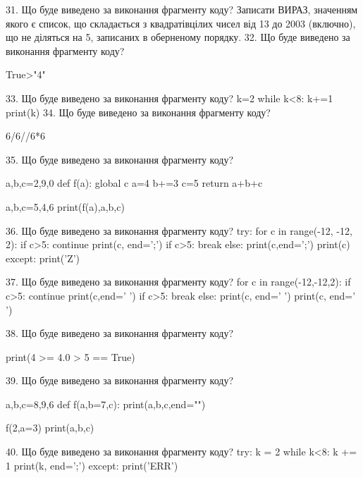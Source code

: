 \documentclass[11pt]{article}
\begin{document}
31. Що буде виведено за виконання фрагменту коду?
Записати ВИРАЗ, значенням якого є список, що складається з квадратівцілих чисел від 13 до 2003 (включно), що не діляться на 5, записаних в оберненому порядку.
32. Що буде виведено за виконання фрагменту коду?

True>"4"

33. Що буде виведено за виконання фрагменту коду?
k=2
   while k<8: k+=1
   print(k)
34. Що буде виведено за виконання фрагменту коду?

6/6//6*6

35. Що буде виведено за виконання фрагменту коду?

a,b,c=2,9,0
def f(a):
global c    a=4
    b+=3
    c=5
    return a+b+c

a,b,c=5,4,6
print(f(a),a,b,c)

36. Що буде виведено за виконання фрагменту коду?
try:
    for c in range(-12, -12, 2):
        if c>5:
            continue
        print(c, end=';')
        if c>5:
            break
    else:
        print(c,end=';')
    print(c)
except:
    print('Z')

37. Що буде виведено за виконання фрагменту коду?
for c in range(-12,-12,2):
    if c>5:
        continue
        print(c,end=' ')
    if c>5:
        break
else:
    print(c, end=' ')
print(c, end=' ')

38. Що буде виведено за виконання фрагменту коду?

print(4 >= 4.0 > 5 == True)

39. Що буде виведено за виконання фрагменту коду?

a,b,c=8,9,6
def f(a,b=7,c):
    print(a,b,c,end="")

f(2,a=3)
print(a,b,c)


40. Що буде виведено за виконання фрагменту коду?
try:
    k = 2
    while k<8:
        k += 1
    print(k, end=';')
except:
    print('ERR')









































\newpage
\end{document}
